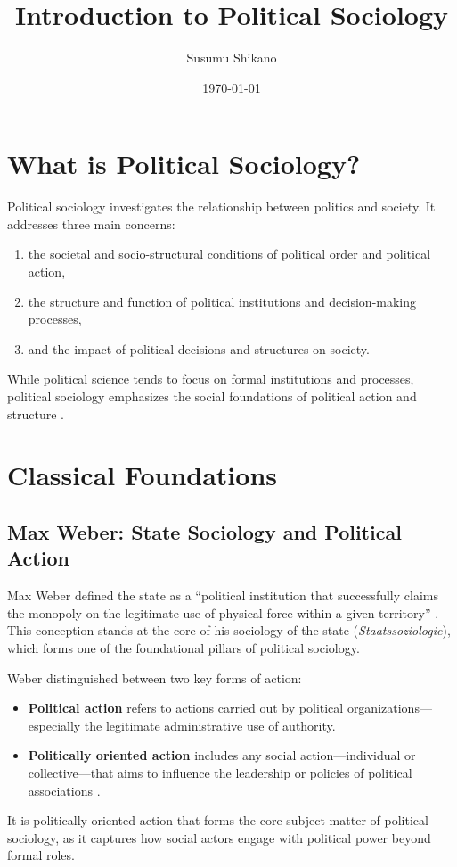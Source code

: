 \documentclass[12pt]{article}
\title{Introduction to Political Sociology}
\author{Susumu Shikano}
\date{\today}
\begin{document}
\maketitle

\section*{What is Political Sociology?}

Political sociology investigates the relationship between politics and society. It addresses three main concerns:
\begin{enumerate}
    \item the societal and socio-structural conditions of political order and political action,
    \item the structure and function of political institutions and decision-making processes,
    \item and the impact of political decisions and structures on society.
\end{enumerate}
While political science tends to focus on formal institutions and processes, political sociology emphasizes the social foundations of political action and structure \parencite{pappi2003}.

\section*{Classical Foundations}

\subsection*{Max Weber: State Sociology and Political Action}

Max Weber defined the state as a “political institution that successfully claims the monopoly on the legitimate use of physical force within a given territory” \parencite[§17]{weber1922}. This conception stands at the core of his sociology of the state (\textit{Staatssoziologie}), which forms one of the foundational pillars of political sociology.

Weber distinguished between two key forms of action:
\begin{itemize}
    \item \textbf{Political action} refers to actions carried out by political organizations—especially the legitimate administrative use of authority.
    \item \textbf{Politically oriented action} includes any social action—individual or collective—that aims to influence the leadership or policies of political associations \parencite{weber1976}.
\end{itemize}
It is politically oriented action that forms the core subject matter of political sociology, as it captures how social actors engage with political power beyond formal roles.
\end{document}
